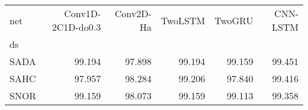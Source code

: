 \begin{tabular}{lrrrrr}
\toprule
net &  Conv1D-2C1D-do0.3 &  Conv2D-Ha &  TwoLSTM &  TwoGRU &  CNN-LSTM \\
ds   &                    &            &          &         &           \\
\midrule
SADA &             99.194 &     97.898 &   99.194 &  99.159 &    99.451 \\
SAHC &             97.957 &     98.284 &   99.206 &  97.840 &    99.416 \\
SNOR &             99.159 &     98.073 &   99.159 &  99.113 &    99.358 \\
\bottomrule
\end{tabular}
